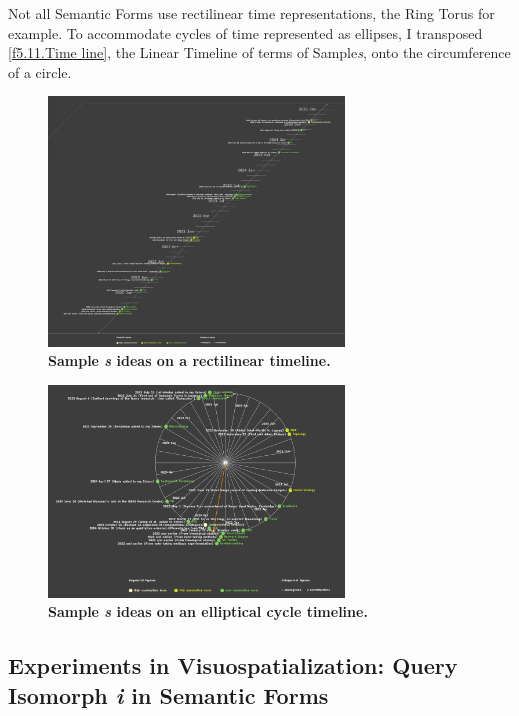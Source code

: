 Not all Semantic Forms use rectilinear time representations, the Ring Torus for example. To accommodate cycles of time represented as ellipses, I transposed \autoref{f5.11.Time line}, the Linear Timeline of terms of Sample\textit{s}, onto the circumference of a circle. 

\FloatBarrier  
\begin{figure}[h!]
    \centering
    \includegraphics[width=0.7\textwidth]{figures/5.11.Time line.png}
    \caption[Sample \textit{s} ideas on a rectilinear timeline]{\textbf{Sample \textit{s} ideas on a rectilinear timeline.}}
    \label{f5.11.Time line}
\end{figure}

\begin{figure}[h!]
    \centering
    \includegraphics[width=0.7\textwidth]{figures/5.11.Time circle.png}
    \caption[Sample \textit{s} ideas on an elliptical cycle timeline]{\textbf{Sample \textit{s} ideas on an elliptical cycle timeline.}}
    \label{f5.11.Time circle}
\end{figure}
\FloatBarrier  



\subsection{Experiments in Visuospatialization: Query Isomorph \textit{i} in Semantic Forms}
